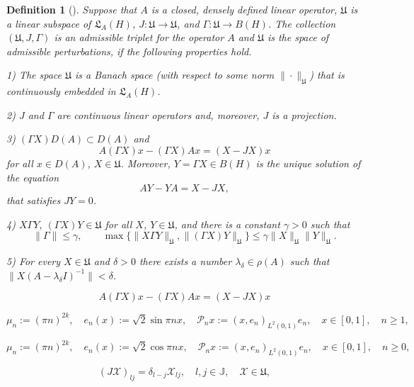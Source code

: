 \documentclass[10pt,a4paper]{amsart}
\newtheorem{definition}{Definition}
\begin{document}
\begin{definition}[\cite{BaskKrUsk}]\label{defadm}
Suppose that $A$ is a closed, densely defined linear operator, $\mathfrak{U}$
is a linear subspace of $\mathfrak{L}_A(H)$, $J:\mathfrak{U}\to\mathfrak{U}$,
and $\Gamma:\mathfrak{U}\to B(H)$. The collection $(\mathfrak{U}, J, \Gamma)$ is an
admissible triplet for the operator $A$ and $\mathfrak{U}$ is the space of
admissible perturbations, if the following properties hold.

1) The space $\mathfrak{U}$ is a Banach space (with respect to some norm
$\|\cdot\|_{\mathfrak{U}}$) that is continuously embedded in $\mathfrak{L}_A(H)$.

2) $J$ and $\Gamma$ are continuous linear operators and, moreover, $J$ is a projection.

3) $(\Gamma X)D(A)\subset D(A)$ and
\begin{equation}\label{adA}
A(\Gamma X)x-(\Gamma X)Ax=(X-JX)x
\end{equation}
for all $x\in D(A)$, $X\in\mathfrak{U}$. Moreover, $Y=\Gamma X\in B(H)$
is the unique solution of the equation
\[
AY-YA=X-JX,
\]
that satisfies $JY=0$.

4) $X\Gamma Y$, $(\Gamma X)Y\in\mathfrak{U}$ for all $X$, $Y\in\mathfrak{U}$,
and there is a constant $\gamma>0$ such that
\[
\|\Gamma\|\leqslant \gamma, \qquad \max\{\|X\Gamma Y\|_{\mathfrak{U}},
\|(\Gamma X)Y\|_{\mathfrak{U}}\}\leqslant \gamma\|X\|_{\mathfrak{U}}\|Y\|_{\mathfrak{U}}.
\]

5) For every $X\in\mathfrak{U}$ and $\delta>0$ there exists a number
$\lambda_\delta\in\rho(A)$ such that~$\|X(A-\lambda_\delta I)^{-1}\|<\delta$.
\end{definition}

\begin{equation}
A(\Gamma X)x-(\Gamma X)Ax=(X-JX)x
\end{equation}

\begin{equation}\label{2.0}
\mu_n:=(\pi n)^{2k},\quad e_n(x):=\sqrt{2}\sin\pi n x,
\quad \mathcal{P}_nx:= (x, e_n)_{L^2(0, 1)}e_n, \quad x\in [0, 1], \quad n\geqslant 1,
\end{equation}

\begin{equation}\label{3.0}
\mu_n:=(\pi n)^{2k},\quad e_n(x):=\sqrt{2}\cos\pi nx,
\quad \mathcal{P}_nx:= (x, e_n)_{L^2(0, 1)}e_n, \quad x\in [0, 1],\quad
n\geqslant 0,
\end{equation}

\begin{equation}\label{j}
(J\mathcal{X})_{lj}=\delta_{l-j}\mathcal{X}_{lj}, \quad l, j\in\mathbb{J}, \quad
\mathcal{X}\in\mathfrak{U},
\end{equation}
\end{document}
